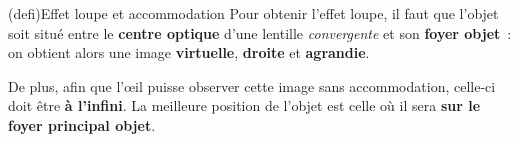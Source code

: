 \documentclass[../../main/main.tex]{subfiles}
\begin{document}
\begin{tcb}[label=def:loupe, valign=center, sidebyside, sidebyside align=top](defi){Effet loupe et accommodation}
	Pour obtenir l'effet loupe, il faut que l'objet soit situé entre le
	\textbf{centre optique} d'une lentille \textit{convergente} et son
	\textbf{foyer objet}~: on obtient alors une image \textbf{virtuelle},
	\textbf{droite} et \textbf{agrandie}.
	\vfill
	\begin{center}
		\label{loupeavecacc}
	\end{center}
	\tcblower
	De plus, afin que l'œil puisse observer cette image sans accommodation,
	celle-ci doit être \textbf{à l'infini}. La meilleure position de l'objet
	est celle où il sera \textbf{sur le foyer principal objet}.
	\vspace{22pt}
	\begin{center}
\end{center}
\end{tcb}
\end{document}
